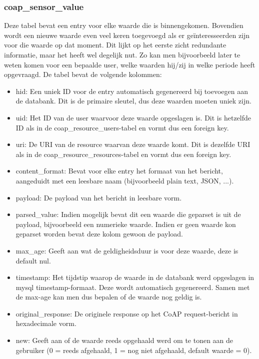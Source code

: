 \subsubsection{coap\_sensor\_value}
Deze tabel bevat een entry voor elke waarde die is binnengekomen. Bovendien wordt een nieuwe waarde even veel keren toegevoegd als er ge\"{i}nteresseerden zijn voor die waarde op dat moment. Dit lijkt op het eerste zicht redundante informatie, maar het heeft wel degelijk nut. Zo kan men bijvoorbeeld later te weten komen voor een bepaalde user, welke waarden hij/zij in welke periode heeft opgevraagd. De tabel bevat de volgende kolommen:
\begin{itemize}
\item hid: Een uniek ID voor de entry automatisch gegenereerd bij toevoegen aan de databank. Dit is de primaire sleutel, dus deze waarden moeten uniek zijn.
\item uid: Het ID van de user waarvoor deze waarde opgeslagen is. Dit is hetzelfde ID als in de coap\_resource\_users-tabel en vormt dus een foreign key.
\item uri: De URI van de resource waarvan deze waarde komt. Dit is dezelfde URI als in de coap\_resource\_resources-tabel en vormt dus een foreign key.
\item content\_format: Bevat voor elke entry het formaat van het bericht, aangeduidt met een leesbare naam (bijvoorbeeld plain text, JSON, ...). 
\item payload: De payload van het bericht in leesbare vorm.
\item parsed\_value: Indien mogelijk bevat dit een waarde die geparset is uit de payload, bijvoorbeeld een numerieke waarde. Indien er geen waarde kon geparset worden bevat deze kolom gewoon de payload.
\item max\_age: Geeft aan wat de geldigheidsduur is voor deze waarde, deze is default nul.
\item timestamp: Het tijdstip waarop de waarde in de databank werd opgeslagen in mysql timestamp-formaat. Deze wordt automatisch gegenereerd. Samen met de max-age kan men dus bepalen of de waarde nog geldig is.
\item original\_response: De originele response op het CoAP request-bericht in hexadecimale vorm.
\item new: Geeft aan of de waarde reeds opgehaald werd om te tonen aan de gebruiker (0 = reeds afgehaald, 1 = nog niet afgehaald, default waarde = 0).
\end{itemize}

